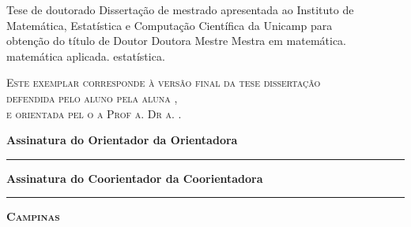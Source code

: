 \vspace{.5cm}
\begin{flushright}
  \begin{minipage}[c]{.8\textwidth}
    \begin{flushright}
      \ifx\mestrado\undefined
      Tese de doutorado
      \else
      Dissertação de mestrado
      \fi
      apresentada ao Instituto de \\ Matemática,
      Estatística e Computação Científica
      da Unicamp para \\ obtenção do título de
      \ifx\mestrado\undefined
      \ifx\femaleAuthor\undefined
      Doutor
      \else
      Doutora
      \fi
      \else
      \ifx\femaleAuthor\undefined
      Mestre
      \else
      Mestra
      \fi
      \fi
      em
      \ifx\matematica\undefined
      \else
      matemática.
      \fi
      \ifx\aplicada\undefined
      \else
      matemática aplicada.
      \fi
      \ifx\estatistica\undefined
      \else
      estatística.
      \fi
    \end{flushright}
  \end{minipage}
\end{flushright}
\vspace{.5cm}
\noindent
{\footnotesize \scshape
Este exemplar corresponde à versão final da 
\ifx\mestrado\undefined
tese
\else
dissertação
\fi \\
defendida 
\ifx\femaleAuthor\undefined
pelo aluno
\else
pela aluna
\fi
\autor,\\
e orientada pel\ifx\femaleOrientador\undefined
o\else
a\fi{} Prof\ifx\femaleOrientador\undefined
\else
a\fi. Dr\ifx\femaleOrientador\undefined
\else
a\fi. \orientador.
}
\vspace{1cm}

\noindent
{\small \bfseries
\noindent
Assinatura
\ifx\femaleOrientador\undefined
do Orientador
\else
da Orientadora
\fi

\vspace{.7cm}
\noindent
\rule[1pt]{7cm}{.5pt}  %
}
\vspace{.5cm}


\ifx\coorientador\undefined
\else
{\small \bfseries
\noindent
Assinatura
\ifx\femaleCoorientador\undefined
do Coorientador
\else
da Coorientadora
\fi

\vspace{.7cm}
\noindent
\rule[1pt]{7cm}{.5pt}  %
}
\fi
\vfill
\begin{center}
  {\small \scshape \bfseries Campinas \\ \ano}
\end{center}
